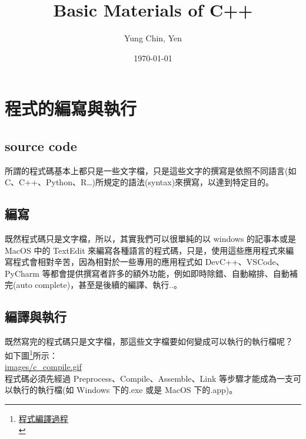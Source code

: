 \documentclass[a4paper,12pt]{article}
\author{Yung Chin, Yen}
\date{\today}
\title{Basic Materials of C++}
\begin{document}
\maketitle
\tableofcontents

\newpage

\section{程式的編寫與執行}
\label{cpp_execution}
\subsection{source code}
\label{sec:orgea7c977}
所謂的程式碼基本上都只是一些文字檔，只是這些文字的撰寫是依照不同語言(如 C、C++、Python、R\ldots{})所規定的語法(syntax)來撰寫，以達到特定目的。\\

\subsection{編寫}
\label{sec:org67c1a0f}
既然程式碼只是文字檔，所以，其實我們可以很單純的以 windows 的記事本或是 MacOS 中的 TextEdit 來編寫各種語言的程式碼，只是，使用這些應用程式來編寫程式會相對辛苦，因為相對於一些專用的應用程式如 DevC++、VSCode、PyCharm 等都會提供撰寫者許多的額外功能，例如即時除錯、自動縮排、自動補完(auto complete)，甚至是後續的編譯、執行..。\\

\subsection{編譯與執行}
\label{sec:org42d37f8}
既然寫完的程式碼只是文字檔，那這些文字檔要如何變成可以執行的執行檔呢？\\
如下圖\footnote{\href{http://www2.lssh.tp.edu.tw/\~hlf/class-1/lang-c/compile.htm}{程式編譯過程}\\}所示：\\

\url{images/c\_compile.gif}\\

程式碼必須先經過 Preprocess、Compile、Assemble、Link 等步驟才能成為一支可以執行的執行檔(如 Windows 下的.exe 或是 MacOS 下的.app)。\\
\end{document}
